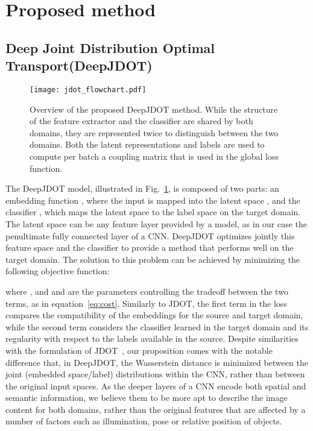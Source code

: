 \documentclass[runningheads]{llncs}
\begin{document}
\section{Proposed method}

\subsection{Deep Joint Distribution Optimal Transport(DeepJDOT)}

\begin{figure}[!t]
\centerline{
  \texttt{[image: jdot\_flowchart.pdf]}
}
  \caption{Overview of the proposed DeepJDOT method. While the structure of the feature extractor  and the classifier  are shared by both domains, they are represented twice to distinguish between the two domains. Both the latent representations and labels are used to compute per batch a coupling matrix  that is used in the global loss function.}
  \label{fig:flow}
\end{figure}

The DeepJDOT model, illustrated in Fig.~\ref{fig:flow}, is composed of two parts: an embedding function , where the input is mapped into the latent space , and the classifier , which maps the latent space to the label space on the target domain. The latent space can be any feature layer provided by a model, as in our case the penultimate fully connected layer of a CNN.
DeepJDOT optimizes jointly this feature space and the classifier to provide a method that performs well on the target domain. The solution to this problem can be achieved by minimizing the following objective function:

where , and  and  are the parameters controlling the tradeoff between the two terms, as in equation~\eqref{eq:cost}. Similarly to JDOT, the first term in the loss compares the compatibility of the embeddings for the source and target domain, while the second term considers the classifier  learned in the target domain and its regularity with respect to the labels available in the source. Despite similarities with the formulation of JDOT~\cite{courty2017joint}, our proposition comes with the notable difference that, in DeepJDOT, the Wasserstein distance is minimized between the joint (embedded space/label) distributions within the CNN, rather than between the original input spaces. As the deeper layers of a CNN encode both spatial and semantic information, we believe them to be more apt to describe the image content for both domains, rather than the original features that are affected by a number of factors such as illumination, pose or relative position of objects.
\end{document}
